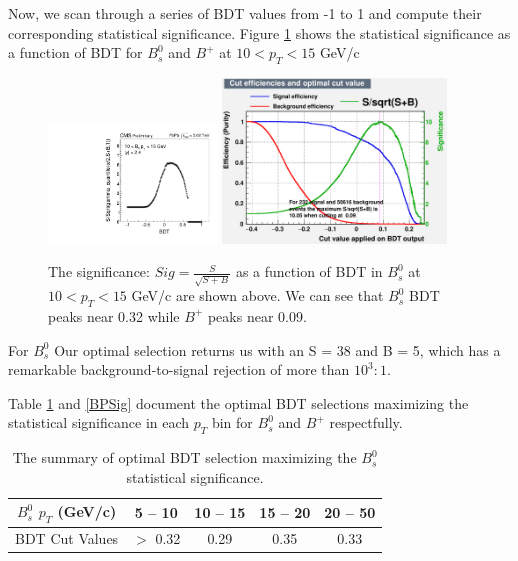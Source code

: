 Now, we scan through a series of BDT values from -1 to 1 and compute their corresponding statistical significance. Figure \ref{WorkingPoint} shows the statistical significance as a function of BDT for $B^0_s$ and $B^+$ at $10 < p_T <  15$ GeV/c

\begin{figure}[h]
\begin{center}
\includegraphics[width= 0.40\textwidth]{Figures/Chapter5/BsSig_10_15.pdf}
\includegraphics[width= 0.53\textwidth]{Figures/Chapter5/BPSig_10_15.pdf}
\caption{The significance: $Sig = \frac{S}{\sqrt{S+B}}$ as a function of BDT in $B^0_s$ at $10 < p_T <  15$ GeV/c are shown above. We can see that $B^0_s$ BDT peaks near 0.32 while $B^+$ peaks near 0.09.}
\label{WorkingPoint}
\end{center}
\end{figure}

For $B^0_s$  Our optimal selection returns us with an S = 38 and B = 5, which has a remarkable background-to-signal rejection of more than $10^3 : 1$.



Table \ref{BsSig} and \ref{BPSig} document the optimal BDT selections maximizing the statistical significance in each $p_T$ bin for $B^0_s$ and $B^+$ respectfully.

\begin{table}[h]
\begin{center}
\caption{The summary of optimal BDT selection maximizing the $B^0_s$ statistical significance.}
\vspace{1em}
\label{BsSig}
  \begin{tabular}{ |c | c| c| c| c|}
    \hline 
$B^0_s$ $p_T$ (GeV/c) & 5 -- 10 & 10 -- 15 & 15 -- 20 &  20 -- 50\\
     \hline
 BDT Cut Values & $>$ 0.32 & 0.29  & 0.35 & 0.33  \\
     \hline
    \hline
\end{tabular}
\end{center}
\end{table}

